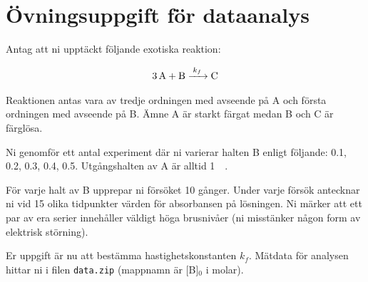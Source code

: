 \section{Övningsuppgift för dataanalys}
\label{sec:exercise}
Antag att ni upptäckt följande exotiska reaktion:

\begin{align}
  \label{eq:fourth-order}
  \ce{3A + B ->[k_f] C}
\end{align}

Reaktionen antas vara av tredje ordningen med avseende på A och första
ordningen med avseende på B. Ämne A är starkt färgat medan B och C är
färglösa.

Ni genomför ett antal experiment där ni varierar halten B enligt
följande: \SI{0.1}{\molar}, \SI{0.2}{\molar}, \SI{0.3}{\molar}, \SI{0.4}{\molar},
\SI{0.5}{\molar}. Utgångshalten av A är alltid \SI{1}{\milli\molar}.

För varje halt av B upprepar ni försöket 10 gånger. Under varje försök
antecknar ni vid 15 olika tidpunkter värden för absorbansen på lösningen.
Ni märker att ett par av era serier innehåller väldigt höga brusnivåer
(ni misstänker någon form av elektrisk störning).

Er uppgift är nu att bestämma hastighetskonstanten $k_f$. Mätdata för
analysen hittar ni i filen {\tt data.zip} (mappnamn är [B]$_0$ i molar).


